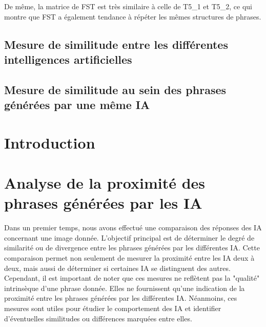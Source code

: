 \documentclass[conference]{IEEEtran}
\begin{document}
\vspace{5mm}

De même, la matrice de FST est très similaire à celle de T5\_1 et T5\_2, ce qui montre que FST a également tendance à répéter les mêmes structures de phrases.

\subsection {Mesure de similitude entre les différentes intelligences artificielles}



\subsection {Mesure de similitude au sein des phrases générées par une même IA}
\subsection {}
\subsection {}
\subsection {}

\section {Introduction}





\vspace{5mm}


\section{Analyse de la proximité des phrases générées par les IA}

Dans un premier temps, nous avons effectué une comparaison des réponses des IA concernant une image donnée. L'objectif principal est de déterminer le degré de similarité ou de divergence entre les phrases générées par les différentes IA. Cette comparaison permet non seulement de mesurer la proximité entre les IA deux à deux, mais aussi de déterminer si certaines IA se distinguent des autres.\\

Cependant, il est important de noter que ces mesures ne reflètent pas la "qualité" intrinsèque d'une phrase donnée. Elles ne fournissent qu'une indication de la proximité entre les phrases générées par les différentes IA. Néanmoins, ces mesures sont utiles pour étudier le comportement des IA et identifier d'éventuelles similitudes ou différences marquées entre elles.
\end{document}

